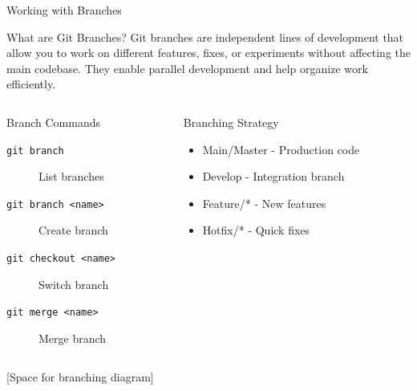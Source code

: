 \documentclass[aspectratio=169]{beamer}
\begin{document}
\begin{frame}{Working with Branches}
  \begin{block}{What are Git Branches?}
    Git branches are independent lines of development that allow you to work on different features, fixes, or experiments without affecting the main codebase. They enable parallel development and help organize work efficiently.
  \end{block}

  \vspace{0.5em}
  \begin{columns}
    \begin{column}{0.48\textwidth}
      \begin{block}{Branch Commands}
        \begin{description}
          \item[\texttt{git branch}] List branches
          \item[\texttt{git branch <name>}] Create branch
          \item[\texttt{git checkout <name>}] Switch branch
          \item[\texttt{git merge <name>}] Merge branch
        \end{description}
      \end{block}
    \end{column}
    
    \begin{column}{0.48\textwidth}
      \begin{exampleblock}{Branching Strategy}
        \begin{itemize}
          \item Main/Master - Production code
          \item Develop - Integration branch
          \item Feature/* - New features
          \item Hotfix/* - Quick fixes
        \end{itemize}
      \end{exampleblock}
    \end{column}
  \end{columns}
  
  \vspace{1em}
  \begin{center}
    [Space for branching diagram]
  \end{center}
\end{frame}
\end{document}
